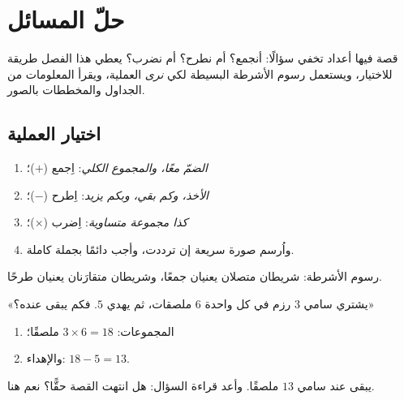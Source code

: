 \chapter{حلّ المسائل}\label{ch:g2:problems}

قصة فيها أعداد تخفي سؤالًا: أنجمع؟ أم نطرح؟ أم نضرب؟ يعطي هذا
الفصل طريقة للاختيار، ويستعمل رسوم الأشرطة البسيطة لكي
\emph{نرى} العملية، ويقرأ المعلومات من الجداول والمخططات
بالصور.

\section{اختيار العملية}

\begin{method}[أي عملية؟]\label{met:g2:problems:choose}
\begin{enumerate}
  \item \emph{الضمّ معًا، والمجموع الكلي}: اِجمع ($+$)؛
  \item \emph{الأخذ، وكم بقي، وبكم يزيد}: اِطرح
        ($-$)؛
  \item \emph{كذا مجموعة متساوية}: اِضرب ($\times$)؛
  \item واُرسم صورة سريعة إن ترددت، وأجب دائمًا بجملة
        كاملة.
\end{enumerate}
\end{method}

\begin{omfigure}

{\small رسوم الأشرطة: شريطان متصلان يعنيان جمعًا، وشريطان
متقارَنان يعنيان طرحًا.}
\end{omfigure}

\begin{example}\label{ex:g2:problems:twostep}
«يشتري سامي $3$ رزم في كل واحدة $6$ ملصقات، ثم يهدي $5$. فكم
يبقى عنده؟»
\begin{enumerate}
  \item المجموعات: $3 \times 6 = 18$ ملصقًا؛
  \item والإهداء: $18 - 5 = 13$.
\end{enumerate}
يبقى عند سامي $13$ ملصقًا. وأعد قراءة السؤال: هل انتهت القصة
حقًّا؟ نعم هنا.
\end{example}

